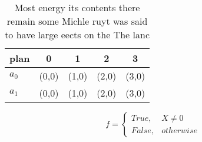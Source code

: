 \documentclass[a4paper]{article}
\begin{document}
\begin{table}
\begin{adjustbox}{width=0.5\columnwidth}
\begin{tabular}{|l|l|l|l|l|}
\hline
\textbf{plan} & \multicolumn{1}{c|}{\textbf{0}} & \multicolumn{1}{c|}{\textbf{1}} & \multicolumn{1}{c|}{\textbf{2}} & \multicolumn{1}{c|}{\textbf{3}} \\ \hline
\textbf{$a_0$}  & (0,0) & (1,0) & (2,0) & (3,0) \\ \hline
\textbf{$a_1$}  & (0,0) & (1,0) & (2,0) & (3,0) \\ \hline
\end{tabular}
\end{adjustbox}
\caption{Most energy its contents there remain some Michle ruyt was said to have large eects on the The lanc
}
\end{table}

\begin{equation}   f =
\begin{cases} True, & X \neq 0\\
False, & otherwise
\end{cases}
\end{equation}
\end{document}
